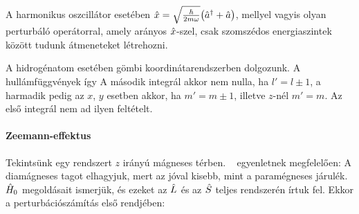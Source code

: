     A harmonikus oszcillátor esetében $\hat{x}=\sqrt{\frac{\hbar}{2m\omega}}\big(\hat{a}^\dagger+\hat{a}\big)$, mellyel
    vagyis olyan perturbáló operátorral, amely arányos $\hat{x}$-szel, csak szomszédos energiaszintek között tudunk átmeneteket létrehozni.
    
    A hidrogénatom esetében gömbi koordinátarendszerben dolgozunk. A hullámfüggvények 
    így
    A második integrál akkor nem nulla, ha $l'=l\pm1$, a harmadik pedig az $x$, $y$ esetben akkor, ha $m'=m\pm 1$, illetve $z$-nél $m'=m$. Az első integrál nem ad ilyen feltételt. 
    
   \paragraph{Zeemann-effektus}
    
    Tekintsünk egy rendszert $z$ irányú mágneses térben. ~ egyenletnek megfelelően:
    A diamágneses tagot elhagyjuk, mert az jóval kisebb, mint a paramégneses járulék. $\hat{H}_0$ megoldásait ismerjük, és ezeket az $\hat{L}$ és az $\hat{S}$ teljes rendszerén írtuk fel. Ekkor a perturbációszámítás első rendjében:
    

